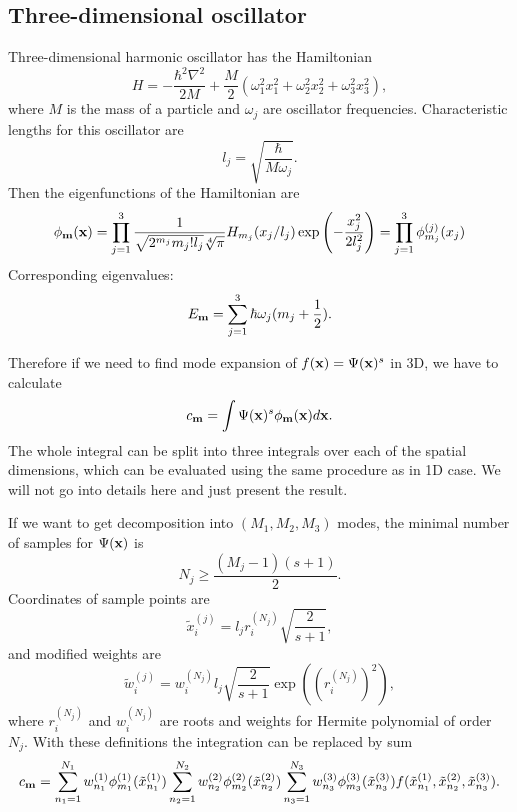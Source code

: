 \subsection{Three-dimensional oscillator}

Three-dimensional harmonic oscillator has the Hamiltonian
\[
    H = -\frac{\hbar^2 \nabla^2}{2 M}
        + \frac{M}{2} (
            \omega_1^2 x_1^2 + \omega_2^2 x_2^2 + \omega_3^2 x_3^2
        ),
\]
where $M$ is the mass of a particle and $\omega_j$ are oscillator frequencies.
Characteristic lengths for this oscillator are
\[
    l_j = \sqrt{\frac{\hbar}{M \omega_j}}.
\]
Then the eigenfunctions of the Hamiltonian are
\[
    \phi_{\mathbf{m}} (\mathbf{x})
    = \prod_{j=1}^3
        \frac{1}{\sqrt{2^{m_j} m_j! l_j} \sqrt[4]{\pi}} H_{m_j}(x_j / l_j)
        \exp \left( -\frac{x_j^2}{2 l_j^2} \right)
    = \prod_{j=1}^3 \phi_{m_j}^{(j)} (x_j)
\]
Corresponding eigenvalues:
\[
    E_{\mathbf{m}} = \sum_{j=1}^3 \hbar \omega_j (m_j + \frac{1}{2}).
\]

Therefore if we need to find mode expansion of $f(\mathbf{x}) = \Psi(\mathbf{x})^s$ in 3D, we have to calculate
\[
    c_{\mathbf{m}} = \int \Psi(\mathbf{x})^s \phi_{\mathbf{m}}(\mathbf{x}) d\mathbf{x}.
\]
The whole integral can be split into three integrals over each of the spatial dimensions,
which can be evaluated using the same procedure as in 1D case.
We will not go into details here and just present the result.

If we want to get decomposition into $(M_1, M_2, M_3)$ modes,
the minimal number of samples for $\Psi(\mathbf{x})$ is
\[
    N_j \ge \frac{(M_j - 1)(s + 1)}{2}.
\]
Coordinates of sample points are
\[
    \tilde{x}_{i}^{(j)} = l_j r_i^{(N_j)} \sqrt{\frac{2}{s+1}},
\]
and modified weights are
\[
    \tilde{w}_{i}^{(j)} = w_i^{(N_j)} l_j \sqrt{\frac{2}{s+1}} \exp((r_i^{(N_j)})^2),
\]
where $r_i^{(N_j)}$ and $w_i^{(N_j)}$ are roots and weights for Hermite polynomial of order $N_j$.
With these definitions the integration can be replaced by sum
\[
    c_{\mathbf{m}}
    = \sum_{n_1=1}^{N_1} w_{n_1}^{(1)} \phi_{m_1}^{(1)} (\tilde{x}_{n_1}^{(1)})
        \sum_{n_2=1}^{N_2} w_{n_2}^{(2)} \phi_{m_2}^{(2)} (\tilde{x}_{n_2}^{(2)})
        \sum_{n_3=1}^{N_3} w_{n_3}^{(3)} \phi_{m_3}^{(3)} (\tilde{x}_{n_3}^{(3)})
        f(\tilde{x}_{n_1}^{(1)}, \tilde{x}_{n_2}^{(2)}, \tilde{x}_{n_3}^{(3)}).
\]

